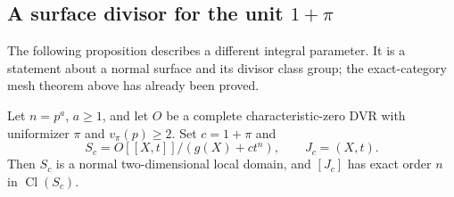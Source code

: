 \subsection[A surface divisor for the unit one plus pi]{A surface divisor for the unit \(1+\pi\)}

The following proposition describes a different integral parameter.
It is a statement about a normal surface and its divisor class group;
the exact-category mesh theorem above has already been proved.

\begin{proposition}\label{prop:pure-power-unit-surface}
Let \(n=p^a\), \(a\ge1\), and let \(O\) be a complete
characteristic-zero DVR with uniformizer \(\pi\) and
\(v_\pi(p)\ge2\).  Set \(c=1+\pi\) and
\[
 S_c=O[[X,t]]/(g(X)+ct^n),\qquad J_c=(X,t).
\]
Then \(S_c\) is a normal two-dimensional local domain, and
\([J_c]\) has exact order \(n\) in \(\operatorname{Cl}(S_c)\).
\end{proposition}

